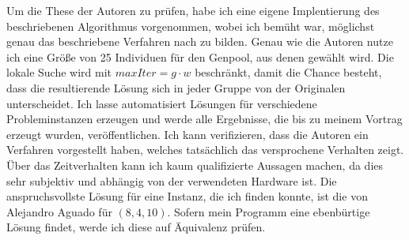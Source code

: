 Um die These der Autoren zu prüfen, habe ich eine eigene Implentierung des beschriebenen Algorithmus vorgenommen, wobei ich bemüht war, möglichst genau das beschriebene Verfahren nach zu bilden.
Genau wie die Autoren nutze ich eine Größe von 25 Individuen für den Genpool, aus denen gewählt wird. Die lokale Suche wird mit $maxIter = g \cdot w$ beschränkt, 
damit die Chance besteht, dass die resultierende Lösung sich in jeder Gruppe von der Originalen unterscheidet. 
Ich lasse automatisiert Lösungen für verschiedene Probleminstanzen erzeugen und werde alle Ergebnisse, die bis zu meinem Vortrag erzeugt wurden, veröffentlichen. 
Ich kann verifizieren, dass die Autoren ein Verfahren vorgestellt haben, welches tatsächlich das versprochene Verhalten zeigt.
Über das Zeitverhalten kann ich kaum qualifizierte Aussagen machen, da dies sehr subjektiv und abhängig von der verwendeten Hardware ist. 
Die anspruchsvollste Lösung für eine Instanz, die ich finden konnte, ist die von Alejandro Aguado\cite{agu04} für $(8, 4, 10)$.
Sofern mein Programm eine ebenbürtige Lösung findet, werde ich diese auf Äquivalenz prüfen.
